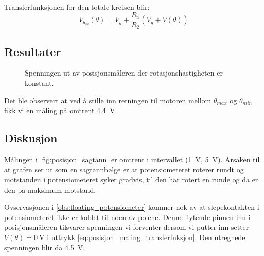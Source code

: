 Transferfunksjonen for den totale kretsen blir:
\begin{equation}
    \label{eq:posisjon_maling_transferfuksjon}
    V_{\theta_m}(\theta) = V_y + \frac{R_4}{R_2}(V_y + V(\theta))
\end{equation}







\subsection{Resultater}

\begin{figure}[h]
    \centering
    
    \caption{Spenningen ut av posisjonsmåleren der rotasjonshastigheten er konstant.}
    \label{fig:posisjon_sagtann}
\end{figure}

\label{obs:floating_potensiometer}
Det ble observert at ved å stille inn retningen til motoren mellom $\theta_{max}$ og $\theta_{min}$ fikk vi en måling på omtrent \SI{4.4}{\volt}.








\subsection{Diskusjon}

Målingen i \autoref{fig:posisjon_sagtann} er omtrent i intervallet (\SI{1}{\volt}, \SI{5}{\volt}). Årsaken til at grafen ser ut som en sagtannbølge er at potensiometeret roterer rundt og motstanden i potensiometeret syker gradvis, til den har rotert en runde og da er den på maksimum motstand.


Ovservasjonen i \ref{obs:floating_potensiometer} kommer nok av at slepekontakten i potensiometeret ikke er koblet til noen av polene. Denne flytende pinnen inn i posisjonsmåleren tilsvarer spenningen vi forventer dersom vi putter inn setter $V(\theta) = \SI{0}{\volt}$ i uttrykk \eqref{eq:posisjon_maling_transferfuksjon}. Den utregnede spenningen blir da \SI{4.5}{\volt}.

